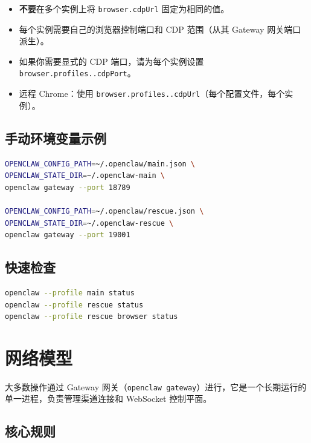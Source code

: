\begin{itemize}
  \item \textbf{不要}在多个实例上将 \texttt{browser.cdpUrl} 固定为相同的值。
  \item 每个实例需要自己的浏览器控制端口和 CDP 范围（从其 Gateway 网关端口派生）。
  \item 如果你需要显式的 CDP 端口，请为每个实例设置 \texttt{browser.profiles..cdpPort}。
  \item 远程 Chrome：使用 \texttt{browser.profiles..cdpUrl}（每个配置文件，每个实例）。
\end{itemize}


\subsection{手动环境变量示例}


\begin{lstlisting}[language=bash]
OPENCLAW_CONFIG_PATH=~/.openclaw/main.json \
OPENCLAW_STATE_DIR=~/.openclaw-main \
openclaw gateway --port 18789

OPENCLAW_CONFIG_PATH=~/.openclaw/rescue.json \
OPENCLAW_STATE_DIR=~/.openclaw-rescue \
openclaw gateway --port 19001
\end{lstlisting}


\subsection{快速检查}


\begin{lstlisting}[language=bash]
openclaw --profile main status
openclaw --profile rescue status
openclaw --profile rescue browser status
\end{lstlisting}



\clearpage

\section{网络模型}

大多数操作通过 Gateway 网关（\texttt{openclaw gateway}）进行，它是一个长期运行的单一进程，负责管理渠道连接和 WebSocket 控制平面。

\subsection{核心规则}


